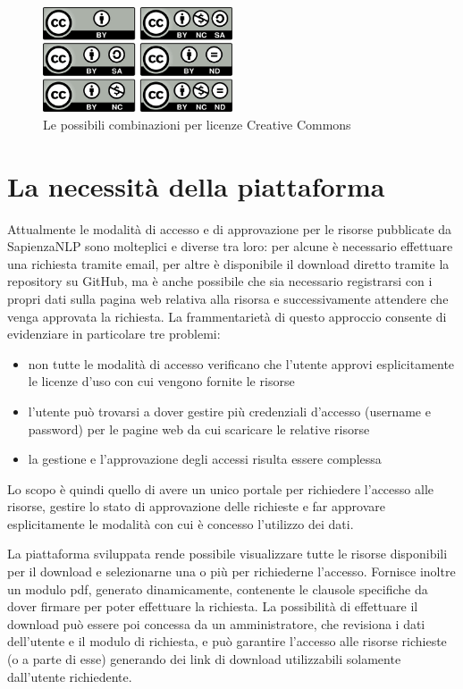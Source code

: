 \begin{figure}[ht]
	\centering
	\includegraphics[width=0.5\textwidth]{assets/creative-commons-licenses.png}
	\caption{Le possibili combinazioni per licenze Creative Commons}
\end{figure}



\section{La necessità della piattaforma}
Attualmente le modalità di accesso e di approvazione per le risorse pubblicate
da SapienzaNLP sono molteplici e diverse tra loro: per alcune è
necessario effettuare una richiesta tramite email, per altre è disponibile il download
diretto tramite la repository su GitHub, ma è anche possibile che sia necessario
registrarsi con i propri dati sulla pagina web relativa alla risorsa e successivamente
attendere che venga approvata la richiesta.
La frammentarietà di questo approccio consente di evidenziare in particolare tre problemi:
\begin{itemize}
	\item non tutte le modalità di accesso verificano che l'utente approvi esplicitamente
	le licenze d'uso con cui vengono fornite le risorse
	\item l'utente può trovarsi a dover gestire più credenziali d'accesso (username
	e password) per le pagine web da cui scaricare le relative risorse
	\item la gestione e l'approvazione degli accessi risulta essere complessa
\end{itemize}

Lo scopo è quindi quello di avere un unico portale per richiedere l'accesso alle
risorse, gestire lo stato di approvazione delle richieste e far approvare
esplicitamente le modalità con cui è concesso l'utilizzo dei dati.

La piattaforma sviluppata rende possibile visualizzare tutte le risorse
disponibili per il download e selezionarne una o più per richiederne l'accesso.
Fornisce inoltre un modulo pdf, generato dinamicamente, contenente le clausole
specifiche da dover firmare per poter effettuare la richiesta. La possibilità di
effettuare il download può essere poi concessa da un amministratore, che revisiona
i dati dell'utente e il modulo di richiesta, e può garantire l'accesso alle risorse
richieste (o a parte di esse) generando dei link di download utilizzabili
solamente dall'utente richiedente.